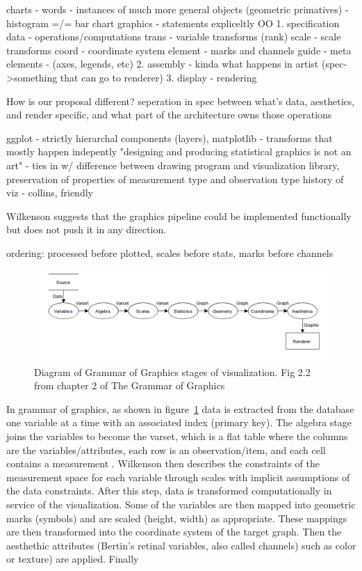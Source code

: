 \documentclass[letterpaper,onecolumn,titlepage]{Ythesis}
\begin{document}
charts - words 
    - instances of much more general objects (geometric primatives)
    - histogram =/= bar chart
graphics - statements 
expliceltly OO
    1. specification
        data - operations/computations
        trans - variable transforms (rank)
        scale - scale transforms
        coord - coordinate system
        element - marks and channels
        guide - meta elements - (axes, legends, etc)
    2. assembly - kinda what happens in artist (spec->something that can go to renderer) 
    3. display - rendering

How is our proposal different? seperation in spec between what's data, aesthetics, and render specific, and what part of the architecture owns those operations


ggplot - strictly hierarchal components (layers), matplotlib - transforms that mostly happen indepently 
"designing and producing statistical graphics is not an art" - ties in w/ difference between drawing program and visualization library, preservation of properties of measurement type and observation type \cite{wickhamGgplot2ElegantGraphics2016a}
history of viz - collins, friendly


Wilkenson suggests that the graphics pipeline could be implemented functionally but does not push it in any direction. 

ordering: processed before plotted, 
scales before stats, marks before channels
\begin{figure}
\includegraphics[]{figures/intro/gog_pathway.png}
\caption{Diagram of Grammar of Graphics stages of visualization. Fig 2.2 from chapter 2 of The Grammar of Graphics\cite{wilkinsonGrammarGraphics2005}}
\label{fig:gog_pathway}
\end{figure}
In grammar of graphics, as shown in figure~\ref{fig:gog_pathway} data is extracted from the database one variable at a time with an associated index (primary key). The algebra stage joins the variables to become the varset, which is a flat table where the columns are the variables/attributes, each row is an observation/item, and each cell contains a measurement \cite{munznerChDataAbstraction}. Wilkenson then describes the constraints of the measurement space for each variable through scales \cite{wilkinsonGrammarGraphics2005} with implicit assumptions of the data constraints. After this step, data is transformed computationally in service of the visualization. Some of the variables are then mapped into geometric marks (symbols) and are scaled (height, width) as appropriate. These mappings are then transformed into the coordinate system of the target graph. Then the aesthethic attributes (Bertin's retinal variables, also called channels) such as color or  texture) are applied. Finally
\end{document}
